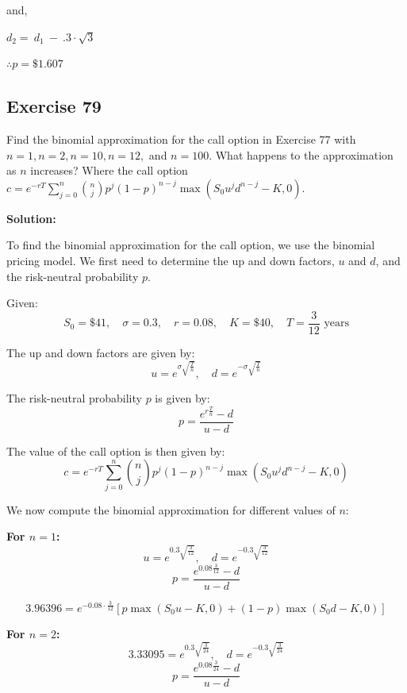 \documentclass{article}
\begin{document}
\vspace{\baselineskip}

and,

\vspace{\baselineskip}

$d_{2} =\  d_{1}\ -\ .3\cdot\sqrt{3}$

\vspace{\baselineskip}

$\therefore p = \$1.607$

\subsection*{Exercise 79}
Find the binomial approximation for the call option in Exercise 77 with \( n = 1, n = 2, n = 10, n = 12, \) and \( n = 100 \). What happens to the approximation as \( n \) increases? Where the call option \( c = e^{-rT} \sum_{j=0}^{n} \binom{n}{j} p^j (1-p)^{n-j} \max(S_0 u^j d^{n-j} - K, 0) \).

\textbf{Solution:}

To find the binomial approximation for the call option, we use the binomial pricing model. We first need to determine the up and down factors, \( u \) and \( d \), and the risk-neutral probability \( p \).

Given:
\[
S_0 = \$41, \quad \sigma = 0.3, \quad r = 0.08, \quad K = \$40, \quad T = \frac{3}{12} \text{ years}
\]

The up and down factors are given by:
\[
u = e^{\sigma \sqrt{\frac{T}{n}}}, \quad d = e^{-\sigma \sqrt{\frac{T}{n}}}
\]

The risk-neutral probability \( p \) is given by:
\[
p = \frac{e^{r \frac{T}{n}} - d}{u - d}
\]

The value of the call option is then given by:
\[
c = e^{-rT} \sum_{j=0}^{n} \binom{n}{j} p^j (1-p)^{n-j} \max(S_0 u^j d^{n-j} - K, 0)
\]

We now compute the binomial approximation for different values of \( n \):

\textbf{For \( n = 1 \):}
\[
u = e^{0.3 \sqrt{\frac{3}{12}}}, \quad d = e^{-0.3 \sqrt{\frac{3}{12}}}
\]
\[
p = \frac{e^{0.08 \frac{3}{12}} - d}{u - d}
\]

\[
3.96396 = e^{-0.08 \cdot \frac{3}{12}} \left[ p \max(S_0 u - K, 0) + (1 - p) \max(S_0 d - K, 0) \right]
\]

\textbf{For \( n = 2 \):}
\[
3.33095 = e^{0.3 \sqrt{\frac{3}{24}}}, \quad d = e^{-0.3 \sqrt{\frac{3}{24}}}
\]
\[
p = \frac{e^{0.08 \frac{3}{24}} - d}{u - d}
\]
\end{document}

